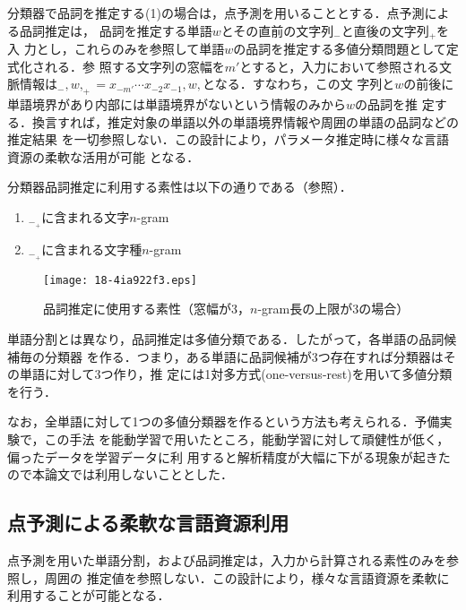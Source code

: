 \documentclass[japanese]{jnlp_1.4}
\def\Bdma#1{}
\def\Conc#1#2{}
\def\figref#1{}
\begin{document}
分類器で品詞を推定する(1)の場合は，点予測を用いることとする．点予測による品詞推定は，
品詞を推定する単語$w$とその直前の文字列$\Bdma{x}_{-}$と直後の文字列$\Bdma{x}_{+}$を入
力とし，これらのみを参照して単語$w$の品詞を推定する多値分類問題として定式化される．参
照する文字列の窓幅を$m'$とすると，入力において参照される文脈情報は$\Bdma{x}_{-}, w,
\Bdma{x}_{+} = x_{-m'} \cdots x_{-2} x_{-1}, w, \Conc{x}{m'}$となる．すなわち，この文
字列と$w$の前後に単語境界があり内部には単語境界がないという情報のみから$w$の品詞を推
定する．換言すれば，推定対象の単語以外の単語境界情報や周囲の単語の品詞などの推定結果
を一切参照しない．この設計により，パラメータ推定時に様々な言語資源の柔軟な活用が可能
となる．


分類器品詞推定に利用する素性は以下の通りである（\figref{figure:KyPT}参照）．
\begin{enumerate}

 \item $\Bdma{x}_{-}\Bdma{x}_{+}$に含まれる文字$n$-gram

 \item $\Bdma{x}_{-}\Bdma{x}_{+}$に含まれる文字種$n$-gram

\end{enumerate}


\begin{figure}[t]
  \begin{center}
\texttt{[image: 18-4ia922f3.eps]}
  \end{center}
  \caption{品詞推定に使用する素性（窓幅が3，$n$-gram長の上限が3の場合）}
  \label{figure:KyPT}
\end{figure}

単語分割とは異なり，品詞推定は多値分類である．したがって，各単語の品詞候補毎の分類器
を作る．つまり，ある単語に品詞候補が3つ存在すれば分類器はその単語に対して3つ作り，推
定には1対多方式(one-versus-rest)を用いて多値分類を行う．

なお，全単語に対して1つの多値分類器を作るという方法も考えられる．予備実験で，この手法
を能動学習で用いたところ，能動学習に対して頑健性が低く，偏ったデータを学習データに利
用すると解析精度が大幅に下がる現象が起きたので本論文では利用しないこととした．



\subsection{点予測による柔軟な言語資源利用}

点予測を用いた単語分割，および品詞推定は，入力から計算される素性のみを参照し，周囲の
推定値を参照しない．この設計により，様々な言語資源を柔軟に利用することが可能となる．
\end{document}
